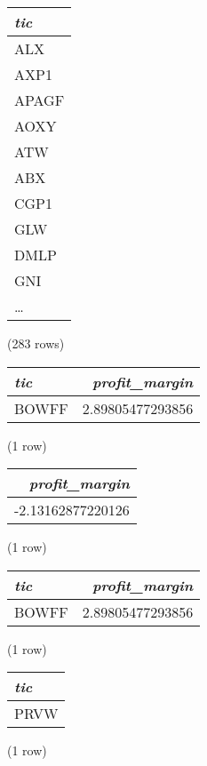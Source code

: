 \begin{center}
\begin{tabular}{l}
\textit{tic} \\
\hline
ALX \\
AXP1 \\
APAGF \\
AOXY \\
ATW \\
ABX \\
CGP1 \\
GLW \\
DMLP \\
GNI \\
\ldots \\
\end{tabular}

\noindent (283 rows) \\
\end{center}

\begin{center}
\begin{tabular}{l | r}
\textit{tic} & \textit{profit\_margin} \\
\hline
BOWFF & 2.89805477293856 \\
\end{tabular}

\noindent (1 row) \\
\end{center}

\begin{center}
\begin{tabular}{r}
\textit{profit\_margin} \\
\hline
-2.13162877220126 \\
\end{tabular}

\noindent (1 row) \\
\end{center}

\begin{center}
\begin{tabular}{l | r}
\textit{tic} & \textit{profit\_margin} \\
\hline
BOWFF & 2.89805477293856 \\
\end{tabular}

\noindent (1 row) \\
\end{center}

\begin{center}
\begin{tabular}{l}
\textit{tic} \\
\hline
PRVW \\
\end{tabular}

\noindent (1 row) \\
\end{center}

